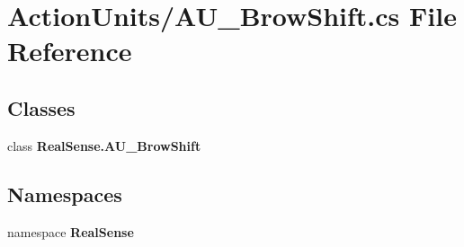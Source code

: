 \section{Action\+Units/\+A\+U\+\_\+\+Brow\+Shift.cs File Reference}
\label{_a_u___brow_shift_8cs}
\subsection*{Classes}
\begin{DoxyCompactItemize}
\item 
class \textbf{ Real\+Sense.\+A\+U\+\_\+\+Brow\+Shift}
\end{DoxyCompactItemize}
\subsection*{Namespaces}
\begin{DoxyCompactItemize}
\item 
namespace \textbf{ Real\+Sense}
\end{DoxyCompactItemize}
